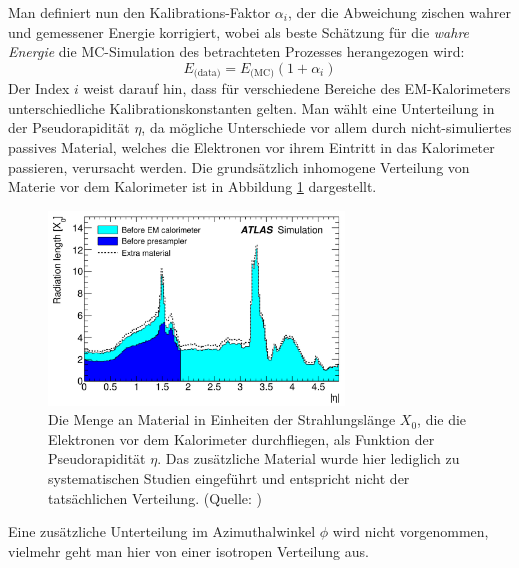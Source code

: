 Man definiert nun den Kalibrations-Faktor $\alpha_i$, der die Abweichung
zischen wahrer und gemessener Energie korrigiert, wobei als beste Schätzung für
die \textit{wahre Energie} die \acs{MC}-Simulation des betrachteten Prozesses
herangezogen wird:
\begin{equation}
    \label{definition:energy_scale}
    E_\text{(data)} = E_\text{(MC)} (1+\alpha_i)
\end{equation}
Der Index $i$ weist darauf hin, dass für verschiedene Bereiche des
EM-Kalorimeters unterschiedliche Kalibrationskonstanten gelten. Man wählt eine
Unterteilung in der Pseudorapidität $\eta$, da mögliche Unterschiede vor allem
durch nicht-simuliertes passives Material, welches die Elektronen vor ihrem 
Eintritt in das Kalorimeter passieren, verursacht werden. Die grundsätzlich
inhomogene Verteilung von Materie vor dem Kalorimeter ist in Abbildung
\ref{fig:extra_material} dargestellt.

\begin{figure}
    \centering
    \includegraphics[width=0.7\textwidth]{img/extra_material}
    \caption[Material vor dem EM-Kalorimeter]
        {Die Menge an Material in Einheiten der Strahlungslänge $X_0$, die die
        Elektronen vor dem Kalorimeter durchfliegen, als Funktion der 
        Pseudorapidität $\eta$. Das zusätzliche Material wurde hier lediglich 
        zu systematischen Studien eingeführt und entspricht nicht der 
        tatsächlichen Verteilung. (Quelle: \cite{Aad:2011mk})}
    \label{fig:extra_material}
\end{figure}

Eine zusätzliche Unterteilung im Azimuthalwinkel $\phi$ wird nicht
vorgenommen, vielmehr geht man hier von einer isotropen Verteilung aus.
\newline


